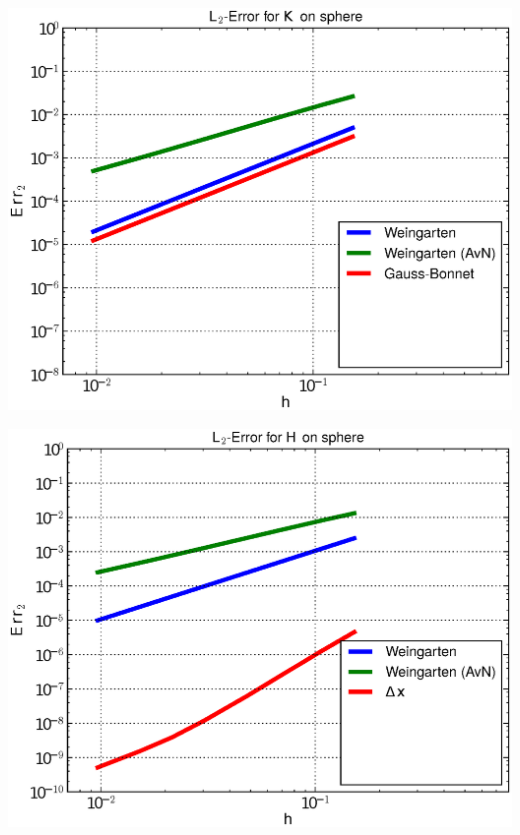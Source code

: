\documentclass[handout]{beamer}
\begin{document}
\begin{frame}
\begin{overprint}
\begin{minipage}[t]{0.49\textwidth}
            \centering\includegraphics[width=\textwidth]{bilder/Curvature/sphere/ErrKL2_3.eps}
          \end{minipage}\hfill
          \begin{minipage}[t]{0.49\textwidth}
            \centering\includegraphics[width=\textwidth]{bilder/Curvature/sphere/ErrHL2_3.eps}
          \end{minipage}
          \begin{minipage}[t]{0.49\textwidth}

\end{minipage}
\end{overprint}
\end{frame}
\end{document}
